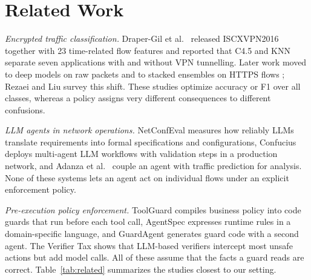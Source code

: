 \documentclass[conference]{IEEEtran}
\begin{document}
\section{Related Work}

\textit{Encrypted traffic classification.} Draper-Gil et al.~\cite{drapergil2016} released ISCXVPN2016 together with 23 time-related flow features and reported that C4.5 and KNN separate seven applications with and without VPN tunnelling. Later work moved to deep models on raw packets \cite{lotfollahi2020} and to stacked ensembles on HTTPS flows \cite{elshewey2025}; Rezaei and Liu \cite{rezaei2019} survey this shift. These studies optimize accuracy or F1 over all classes, whereas a policy assigns very different consequences to different confusions.

\textit{LLM agents in network operations.} NetConfEval \cite{wang2024netconfeval} measures how reliably LLMs translate requirements into formal specifications and configurations, Confucius \cite{wang2025confucius} deploys multi-agent LLM workflows with validation steps in a production network, and Adanza et al.~\cite{adanza2026} couple an agent with traffic prediction for analysis. None of these systems lets an agent act on individual flows under an explicit enforcement policy.

\textit{Pre-execution policy enforcement.} ToolGuard \cite{zwerdling2025} compiles business policy into code guards that run before each tool call, AgentSpec \cite{wang2026agentspec} expresses runtime rules in a domain-specific language, and GuardAgent \cite{xiang2025guardagent} generates guard code with a second agent. The Verifier Tax \cite{sah2026verifier} shows that LLM-based verifiers intercept most unsafe actions but add model calls. All of these assume that the facts a guard reads are correct. Table~\ref{tab:related} summarizes the studies closest to our setting.
\end{document}
